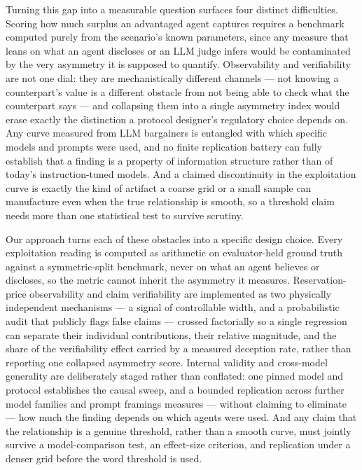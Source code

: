 \documentclass[11pt]{article}
\begin{document}
Turning this gap into a measurable question surfaces four distinct difficulties. Scoring how much surplus an advantaged agent captures requires a benchmark computed purely from the scenario's known parameters, since any measure that leans on what an agent discloses or an LLM judge infers would be contaminated by the very asymmetry it is supposed to quantify. Observability and verifiability are not one dial: they are mechanistically different channels --- not knowing a counterpart's value is a different obstacle from not being able to check what the counterpart says --- and collapsing them into a single asymmetry index would erase exactly the distinction a protocol designer's regulatory choice depends on. Any curve measured from LLM bargainers is entangled with which specific models and prompts were used, and no finite replication battery can fully establish that a finding is a property of information structure rather than of today's instruction-tuned models. And a claimed discontinuity in the exploitation curve is exactly the kind of artifact a coarse grid or a small sample can manufacture even when the true relationship is smooth, so a threshold claim needs more than one statistical test to survive scrutiny.

Our approach turns each of these obstacles into a specific design choice. Every exploitation reading is computed as arithmetic on evaluator-held ground truth against a symmetric-split benchmark, never on what an agent believes or discloses, so the metric cannot inherit the asymmetry it measures. Reservation-price observability and claim verifiability are implemented as two physically independent mechanisms --- a signal of controllable width, and a probabilistic audit that publicly flags false claims --- crossed factorially so a single regression can separate their individual contributions, their relative magnitude, and the share of the verifiability effect carried by a measured deception rate, rather than reporting one collapsed asymmetry score. Internal validity and cross-model generality are deliberately staged rather than conflated: one pinned model and protocol establishes the causal sweep, and a bounded replication across further model families and prompt framings measures --- without claiming to eliminate --- how much the finding depends on which agents were used. And any claim that the relationship is a genuine threshold, rather than a smooth curve, must jointly survive a model-comparison test, an effect-size criterion, and replication under a denser grid before the word threshold is used.
\end{document}
